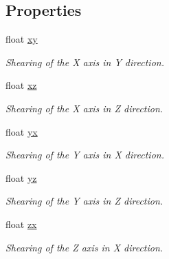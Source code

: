 \subsection*{Properties}
\begin{DoxyCompactItemize}
\item 
float \hyperlink{class_grid_framework_1_1_vectors_1_1_vector6_a2ad5ebb8120ce653ef9201f60fa266b2_a2ad5ebb8120ce653ef9201f60fa266b2}{xy}
\begin{DoxyCompactList}\small\item\em Shearing of the {\itshape X} axis in {\itshape Y} direction.\end{DoxyCompactList}\item 
float \hyperlink{class_grid_framework_1_1_vectors_1_1_vector6_a3e756c556026961df6d0e0ae5172df16_a3e756c556026961df6d0e0ae5172df16}{xz}
\begin{DoxyCompactList}\small\item\em Shearing of the {\itshape X} axis in {\itshape Z} direction.\end{DoxyCompactList}\item 
float \hyperlink{class_grid_framework_1_1_vectors_1_1_vector6_a6a73271b83f35cdf32b17131eb4e2900_a6a73271b83f35cdf32b17131eb4e2900}{yx}
\begin{DoxyCompactList}\small\item\em Shearing of the {\itshape Y} axis in {\itshape X} direction.\end{DoxyCompactList}\item 
float \hyperlink{class_grid_framework_1_1_vectors_1_1_vector6_a4f22ae6f20adcd03c347f40c7f92ec1f_a4f22ae6f20adcd03c347f40c7f92ec1f}{yz}
\begin{DoxyCompactList}\small\item\em Shearing of the {\itshape Y} axis in {\itshape Z} direction.\end{DoxyCompactList}\item 
float \hyperlink{class_grid_framework_1_1_vectors_1_1_vector6_ab27c48ff072b75aaf98fff8ef0a49824_ab27c48ff072b75aaf98fff8ef0a49824}{zx}
\begin{DoxyCompactList}\small\item\em Shearing of the {\itshape Z} axis in {\itshape X} direction.\end{DoxyCompactList}\item 

\end{DoxyCompactItemize}

